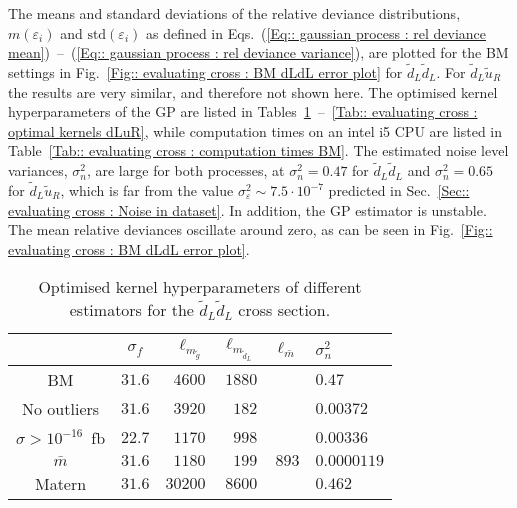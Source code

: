 \documentclass[twoside,english]{uiofysmaster}
\begin{document}
{{The means and standard deviations of the relative deviance distributions, $m(\varepsilon_i)$ and $\text{std}(\varepsilon_i)$ as defined in Eqs.~(\ref{Eq:: gaussian process : rel deviance mean})~--~(\ref{Eq:: gaussian process : rel deviance variance}), are plotted for the BM settings in Fig.~\ref{Fig:: evaluating cross : BM dLdL error plot} for $\widetilde{d}_L \widetilde{d}_L$. For $\widetilde{d}_L \widetilde{u}_R$  the results are very similar, and therefore not shown here. The optimised kernel hyperparameters of the GP are listed in Tables~\ref{Tab:: evaluating cross : optimal kernels dLdL}~--~\ref{Tab:: evaluating cross : optimal kernels dLuR}, while computation times on an intel i5 CPU are listed in Table~\ref{Tab:: evaluating cross : computation times BM}. The estimated noise level variances, $\sigma_n^2$, are large for both processes, at $\sigma_n^2=0.47$ for $\widetilde{d}_L \widetilde{d}_L$ and $\sigma_n^2=0.65$ for $\widetilde{d}_L \widetilde{u}_R$, which is far from the value $\sigma_{\varepsilon}^2 \sim 7.5 \cdot 10^{-7}$ predicted in Sec.~\ref{Sec:: evaluating cross : Noise in dataset}. In addition, the GP estimator is unstable. The mean relative deviances oscillate around zero, as can be seen in Fig.~\ref{Fig:: evaluating cross : BM dLdL error plot}.

\begin{table}
\centering
\begin{tabular}{@{}ccrrrl@{}} \toprule
 & $\sigma_f$ & $\ell_{m_{\widetilde{g}}}$ & $\ell_{m_{\widetilde{d}_L}}$ & $\ell_{\bar{m}}$ & $\sigma_n^2$\\ \midrule
BM & $31.6$ & $4600 $& $ 1880$ & & $0.47$\\
No outliers & $31.6$ & $3920$ & $182$ & & $0.00372$\\
$\sigma > 10^{-16}$~fb & $22.7$ & $1170$&  $998$ && $0.00336$\\
$\bar{m}$ & $31.6$ & $1180$ & $199$ & $893$ & $0.0000119$\\
Matern & $31.6$ & $30200$ & $8600$ && $0.462$\\ \bottomrule
\end{tabular}
\caption{Optimised kernel hyperparameters of different estimators for the $\widetilde{d}_L \widetilde{d}_L$ cross section.}
\label{Tab:: evaluating cross : optimal kernels dLdL}
\end{table}


}}
\end{document}
